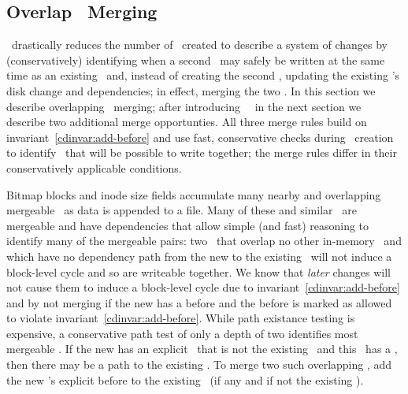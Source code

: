 \subsection{Overlap \ChDesc\ Merging}
\label{sec:chdescs:overlap-merge}
\Kudos\ drastically reduces the number of \chdescs\ created to
describe a system of changes by (conservatively) identifying when a
second \chdesc\ may safely be written at the same time as an existing
\chdesc\ and, instead of creating the second \chdesc, updating the
existing \chdesc's disk change and dependencies; in effect, merging
the two \chdescs.
%
In this section we describe overlapping \chdesc\ merging; after
introducing \nrb\ \chdescs\ in the next section we describe
two additional merge opportunties.
%
All three merge rules build on invariant~\ref{cdinvar:add-before}
and use fast, conservative checks during \chdesc\ creation to identify
\chdescs\ that will be possible to write together;
%
the merge rules differ in their conservatively applicable conditions.

Bitmap blocks and inode size fields accumulate many nearby and
overlapping mergeable \chdescs\ as data is appended to a file.
%
Many of these and similar \chdescs\ are mergeable and have
dependencies that allow simple (and fast) reasoning to identify many
of the mergeable pairs: two \chdescs\ that overlap no other in-memory \chdescs\
and which have no dependency path from the new to the existing \chdesc\
will not induce a block-level cycle and so are writeable together.
We know that \textit{later} changes will not cause them to induce a block-level cycle due to
invariant~\ref{cdinvar:add-before} and by not merging if the new \chdesc{}
has a before and the before is marked as allowed to violate
invariant~\ref{cdinvar:add-before}.
%
While path existance testing is expensive, a conservative path test
of only a depth of two identifies most mergeable \chdescs. If the new
\chdesc{} has an explicit \before\ that is not the existing \chdesc\ and
this \before\ has a \before, then there may be a path to the existing
\chdesc.
%
To merge two such overlapping \chdescs, add the new \chdesc{}'s explicit
before to the existing \chdesc\ (if any and if not the existing \chdesc).
